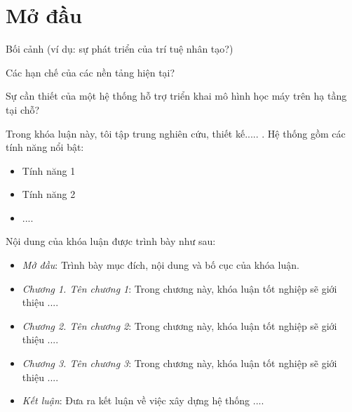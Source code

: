 \clearpage
{}

\chapter*{Mở đầu}


Bối cảnh (ví dụ: sự phát triển của trí tuệ nhân tạo?)

Các hạn chế của các nền tảng hiện tại?

Sự cần thiết của một hệ thống hỗ trợ triển khai mô hình học máy trên hạ tầng tại chỗ?



Trong khóa luận này, tôi tập trung nghiên cứu, thiết kế..... .  Hệ thống gồm các tính năng nổi bật:

\renewcommand{\labelitemi}{$-$}
\begin{itemize}
	\item Tính năng 1
	\item Tính năng 2
	\item ....
\end{itemize}
\vspace{0.3cm}


Nội dung của khóa luận được trình bày như sau:

\renewcommand{\labelitemi}{$-$}
\begin{itemize}
	\item \textit{Mở đầu}: Trình bày mục đích, nội dung và bố cục của khóa luận.
	\item \textit{Chương 1. Tên chương 1}: Trong chương này, khóa luận tốt nghiệp sẽ giới thiệu ....
	\item \textit{Chương 2. Tên chương 2}: Trong chương này, khóa luận tốt nghiệp sẽ giới thiệu ....
	\item \textit{Chương 3. Tên chương 3}: Trong chương này, khóa luận tốt nghiệp sẽ giới thiệu ....
	\item \textit{Kết luận}: Đưa ra kết luận về việc xây dựng hệ thống ....
\end{itemize} 